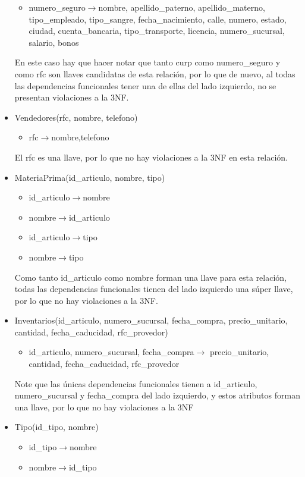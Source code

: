 \documentclass[11pt]{article}
\begin{document}
\begin{itemize}
\begin{itemize}
        \item numero\_seguro$\rightarrow$nombre, apellido\_paterno, apellido\_materno, tipo\_empleado, tipo\_sangre, fecha\_nacimiento, calle, numero, estado, ciudad, cuenta\_bancaria, tipo\_transporte, licencia, numero\_sucursal, salario, bonos
      \end{itemize}
      En este caso hay que hacer notar que tanto curp como numero\_seguro y como rfc son llaves candidatas de esta relación, por lo que de nuevo, al todas las dependencias funcionales tener una de ellas del lado izquierdo, no se presentan violaciones a la 3NF.
\item Vendedores(rfc, nombre, telefono)
      \begin{itemize}
        \item rfc$\rightarrow$nombre,telefono
      \end{itemize}
      El rfc es una llave, por lo que no hay violaciones a la 3NF en esta relación.
\item MateriaPrima(id\_articulo, nombre, tipo)
      \begin{itemize}
        \item id\_articulo$\rightarrow$nombre
        \item nombre$\rightarrow$id\_articulo
        \item id\_articulo$\rightarrow$tipo
        \item nombre$\rightarrow$tipo
      \end{itemize}
      Como tanto id\_articulo como nombre forman una llave para esta relación, todas las dependencias funcionales tienen del lado izquierdo una súper llave, por lo que no hay violaciones a la 3NF.
\item Inventarios(id\_articulo, numero\_sucursal, fecha\_compra, precio\_unitario, cantidad, fecha\_caducidad, rfc\_provedor)
      \begin{itemize}
        \item id\_articulo, numero\_sucursal, fecha\_compra$\rightarrow$ precio\_unitario, cantidad, fecha\_caducidad, rfc\_provedor
      \end{itemize}
      Note que las únicas dependencias funcionales tienen a id\_articulo, numero\_sucursal y fecha\_compra del lado izquierdo, y estos atributos forman una llave, por lo que no hay violaciones a la 3NF
\item Tipo(id\_tipo, nombre)
      \begin{itemize}
        \item id\_tipo$\rightarrow$nombre
        \item nombre$\rightarrow$id\_tipo   

\end{itemize}
\end{itemize}
\end{document}
